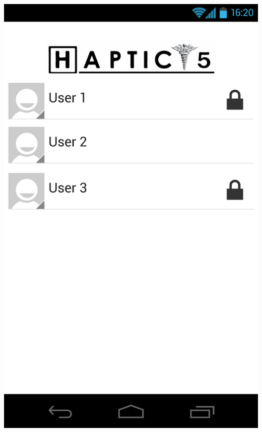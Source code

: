 \documentclass[pdftex,12pt,a4paper]{report}
\begin{document}
\begin{center}
	\includegraphics[scale=0.18]{Screens/01-Home---Change-User.png}

\end{center}
\end{document}
